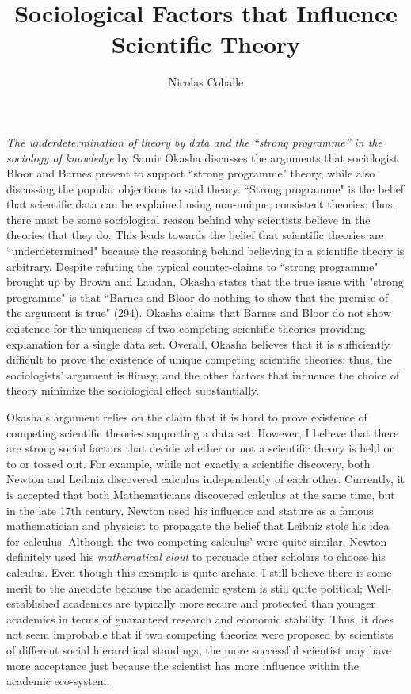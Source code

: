\documentclass[11pt]{article}
\title{Sociological Factors that Influence Scientific Theory}
\author{Nicolas Coballe}
\begin{document}
\doublespacing

\maketitle

\textit{The underdetermination of theory by data and the ``strong programme'' in the sociology of  knowledge} by Samir Okasha discusses the arguments that sociologist Bloor and Barnes present to support ``strong programme" theory, while also discussing the popular objections to said theory. ``Strong programme" is the belief that scientific data can be explained using non-unique, consistent theories; thus, there must be some sociological reason behind why scientists believe in the theories that they do. This leads towards the belief that scientific theories are ``underdetermined" because the reasoning behind believing in a scientific theory is arbitrary. Despite refuting the typical counter-claims to ``strong programme" brought up by Brown and Laudan, Okasha states that the true issue with "strong programme" is that ``Barnes and Bloor do nothing to show that the premise of the argument is true" (294). Okasha claims that Barnes and Bloor do not show existence for the uniqueness of two competing scientific theories providing explanation for a single data set. Overall, Okasha believes that it is sufficiently difficult to prove the existence of unique competing scientific theories; thus, the sociologists' argument is flimsy, and the other factors that influence the choice of theory minimize the sociological effect substantially.

Okasha's argument relies on the claim that it is hard to prove existence of competing scientific theories supporting a data set. However, I believe that there are strong social factors that decide whether or not a scientific theory is held on to or tossed out. For example, while not exactly a scientific discovery, both Newton and Leibniz discovered calculus independently of each other. Currently, it is accepted that both Mathematicians discovered calculus at the same time, but in the late 17th century, Newton used his influence and stature as a famous mathematician and physicist to propagate the belief that Leibniz stole his idea for calculus. Although the two competing calculus' were quite similar, Newton definitely used his \textit{mathematical clout} to persuade other scholars to choose his calculus. Even though this example is quite archaic, I still believe there is some merit to the anecdote because the academic system is still quite political; Well-established academics are typically more secure and protected than younger academics in terms of guaranteed research and economic stability. Thus, it does not seem improbable that if two competing theories were proposed by scientists of different social hierarchical standings, the more successful scientist may have more acceptance just because the scientist has more influence within the academic eco-system.
\end{document}

